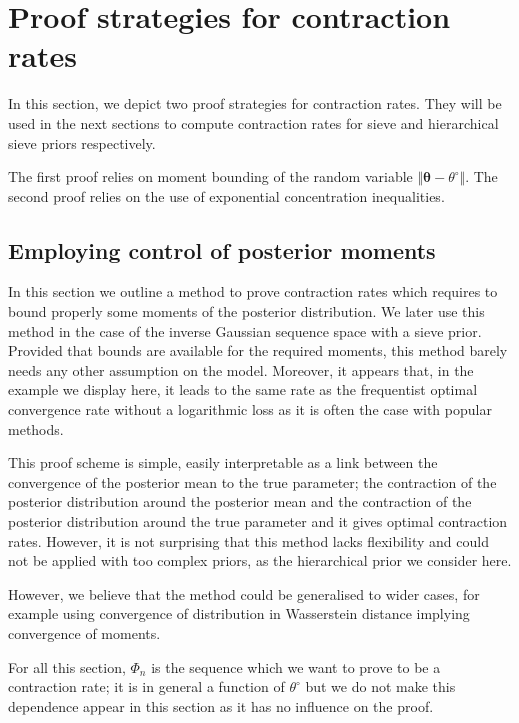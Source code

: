 \section{Proof strategies for contraction rates}\label{BAYES_STRATEGIES}

In this section, we depict two proof strategies for contraction rates.
They will be used in the next sections to compute contraction rates for sieve and hierarchical sieve priors respectively.

The first proof relies on moment bounding of the random variable $\Vert \boldsymbol{\theta} - \theta^{\circ} \Vert$.
The second proof relies on the use of exponential concentration inequalities.

\subsection{Employing control of posterior moments}\label{BAYES_STRATEGIES_MOMENT}

In this section we outline a method to prove contraction rates which requires to bound properly some moments of the posterior distribution.
We later use this method in the case of the inverse Gaussian sequence space with a sieve prior.
Provided that bounds are available for the required moments, this method barely needs any other assumption on the model.
Moreover, it appears that, in the example we display here, it leads to the same rate as the frequentist optimal convergence rate without a logarithmic loss as it is often the case with popular methods.

This proof scheme is simple, easily interpretable as a link between the convergence of the posterior mean to the true parameter; the contraction of the posterior distribution around the posterior mean and the contraction of the posterior distribution around the true parameter and it gives optimal contraction rates.
However, it is not surprising that this method lacks flexibility and could not be applied with too complex priors, as the hierarchical prior we consider here.

However, we believe that the method could be generalised to wider cases, for example using convergence of distribution in Wasserstein distance implying convergence of moments.

\medskip

For all this section, $\Phi_{n}$ is the sequence which we want to prove to be a contraction rate; it is in general a function of $\theta^{\circ}$ but we do not make this dependence appear in this section as it has no influence on the proof.


